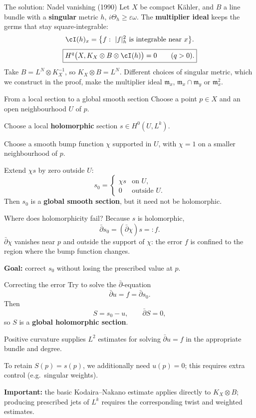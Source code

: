 \begin{frame}{The solution: Nadel vanishing (1990)}
Let \(X\) be compact Kähler, and \(B\) a line bundle with a \textbf{singular} metric \(h\), \(i\Theta_h\ge\varepsilon\omega\).
The \textbf{multiplier ideal} keeps the germs that stay square-integrable:
\[
\cI(h)_x=\bigl\{f:\ |f|_h^2\ \text{is integrable near}\ x\bigr\}.
\]
\[
\boxed{H^q\bigl(X,K_X\otimes B\otimes\cI(h)\bigr)=0\qquad(q>0).}
\]
Take \(B=L^N\otimes K_X^{-1}\), so \(K_X\otimes B=L^N\).
Different choices of singular metric, which we construct in the proof, make the multiplier ideal
\(\mathfrak m_x\), \(\mathfrak m_x\cap\mathfrak m_y\) or \(\mathfrak m_x^2\).
\end{frame}



\appendix
\begin{frame}{From a local section to a global smooth section}
Choose a point \(p\in X\) and an open neighbourhood \(U\) of \(p\).
\par\medskip
Choose a local \textbf{holomorphic} section \(s\in H^0(U,L^k)\).
\par\medskip
Choose a smooth bump function \(\chi\) supported in \(U\), with
\(\chi=1\) on a smaller neighbourhood of \(p\).
\par\medskip
Extend \(\chi s\) by zero outside \(U\):
\[
s_0=\begin{cases}\chi s&\text{on }U,\\0&\text{outside }U.\end{cases}
\]
Then \(s_0\) is a \textbf{global smooth section}, but it need not be holomorphic.
\end{frame}

\begin{frame}{Where does holomorphicity fail?}
Because \(s\) is holomorphic,
\[
\bar\partial s_0=(\bar\partial\chi)s=:f.
\]
\(\bar\partial\chi\) vanishes near \(p\) and outside the support
of \(\chi\): the error \(f\) is confined to the region where
the bump function changes.
\par\bigskip
\textbf{Goal:} correct \(s_0\) without losing the prescribed value at \(p\).
\end{frame}

\begin{frame}{Correcting the error}
Try to solve the \(\bar\partial\)-equation
\[
\bar\partial u=f=\bar\partial s_0.
\]
Then
\[
S=s_0-u,\qquad \bar\partial S=0,
\]
so \(S\) is a \textbf{global holomorphic section}.
\par\medskip
Positive curvature supplies \(L^2\) estimates for solving
\(\bar\partial u=f\) in the appropriate bundle and degree.
\par\medskip
To retain \(S(p)=s(p)\), we additionally need \(u(p)=0\);
this requires extra control (e.g.\ singular weights).
\par\medskip
\textbf{Important:} the basic Kodaira--Nakano estimate applies directly
to \(K_X\otimes B\); producing prescribed jets of \(L^k\)
requires the corresponding twist and weighted estimates.
\end{frame}


